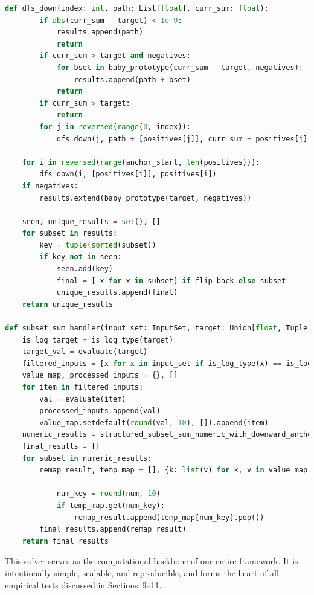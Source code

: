 \documentclass[11pt]{article}
\begin{document}
\begin{lstlisting}[language=Python, basicstyle=\ttfamily\footnotesize, breaklines=true]
    def dfs_down(index: int, path: List[float], curr_sum: float):
        if abs(curr_sum - target) < 1e-9:
            results.append(path)
            return
        if curr_sum > target and negatives:
            for bset in baby_prototype(curr_sum - target, negatives):
                results.append(path + bset)
            return
        if curr_sum > target:
            return
        for j in reversed(range(0, index)):
            dfs_down(j, path + [positives[j]], curr_sum + positives[j])

    for i in reversed(range(anchor_start, len(positives))):
        dfs_down(i, [positives[i]], positives[i])
    if negatives:
        results.extend(baby_prototype(target, negatives))

    seen, unique_results = set(), []
    for subset in results:
        key = tuple(sorted(subset))
        if key not in seen:
            seen.add(key)
            final = [-x for x in subset] if flip_back else subset
            unique_results.append(final)
    return unique_results

def subset_sum_handler(input_set: InputSet, target: Union[float, Tuple[str, Union[int, float], Union[int, float]]]) -> List[List[InputElement]]:
    is_log_target = is_log_type(target)
    target_val = evaluate(target)
    filtered_inputs = [x for x in input_set if is_log_type(x) == is_log_target]
    value_map, processed_inputs = {}, []
    for item in filtered_inputs:
        val = evaluate(item)
        processed_inputs.append(val)
        value_map.setdefault(round(val, 10), []).append(item)
    numeric_results = structured_subset_sum_numeric_with_downward_anchoring(processed_inputs, target_val)
    final_results = []
    for subset in numeric_results:
        remap_result, temp_map = [], {k: list(v) for k, v in value_map.items()}

            num_key = round(num, 10)
            if temp_map.get(num_key):
                remap_result.append(temp_map[num_key].pop())
        final_results.append(remap_result)
    return final_results
\end{lstlisting}

\vspace{2mm}
\noindent
This solver serves as the computational backbone of our entire framework. It is intentionally simple, scalable, and reproducible, and forms the heart of all empirical tests discussed in Sections~9--11.
\end{document}
